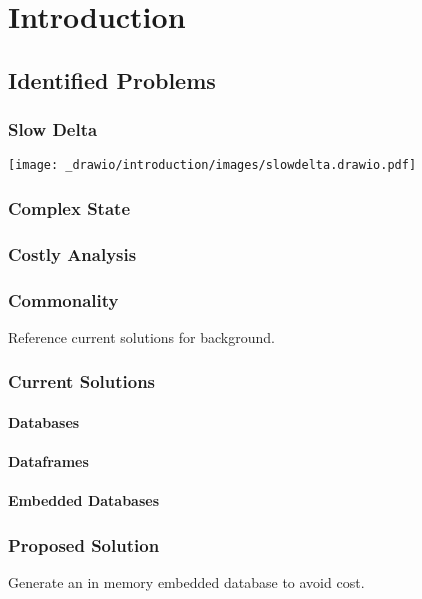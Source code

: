 \chapter{Introduction}

\section{Identified Problems}

\subsection{Slow Delta}
\texttt{[image: \_drawio/introduction/images/slowdelta.drawio.pdf]}
\subsection{Complex State}
\subsection{Costly Analysis}

\subsection{Commonality}


Reference current solutions for background.

\subsection{Current Solutions}
\subsubsection{Databases}
\subsubsection{Dataframes}
\subsubsection{Embedded Databases}

\subsection{Proposed Solution}
Generate an in memory embedded database to avoid cost.

